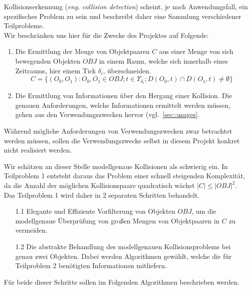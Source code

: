 Kollisionserkennung (\textit{eng. collision detection}) scheint, je nach Anwendungsfall, ein spezifisches Problem zu sein und beschreibt daher eine Sammlung verschiedener Teilprobleme.\\
Wir beschränken uns hier für die Zwecke des Projektes auf Folgende:
\begin{enumerate}
\item Die Ermittlung der Menge von Objektpaaren $C$ aus einer Menge von sich bewegenden Objekten $OBJ$ in einem Raum, welche sich innerhalb eines Zeitraums, hier einem Tick $\delta_i$, überschneiden.
$$C = \{(O_0, O_1) : O_0, O_1 \in OBJ; t\in \Upsilon_{\delta_i};  D(O_0, t) \cap D(O_1, t) \neq \emptyset\}$$
\item Die Ermittlung von Informationen über den Hergang einer Kollision.
Die genauen Anforderungen, welche Informationen ermittelt werden müssen, gehen aus den Verwendungszwecken hervor (vgl.~\ref{sec::usages}. 
\end{enumerate}

Während mögliche Anforderungen von Verwendungszwecken zwar betrachtet werden müssen, sollen die Verwendungszwecke selbst in diesem Projekt konkret nicht realisiert werden.

Wir schätzen an dieser Stelle modellgenaue Kollisionen als schwierig ein. In Teilproblem 1 entsteht daraus das Problem einer schnell steigenden Komplexität, da die Anzahl der möglichen Kollisionspaare quadratisch wächst $|C|\leq |OBJ|^2$.\\
Das Teilproblem 1 wird daher in 2 separaten Schritten behandelt.
\begin{itemize}
\item[1.1] Elegante und Effiziente Vorfilterung von Objekten $OBJ$, um die modellgenaue Überprüfung von großen Mengen von Objektpaaren in $C$ zu vermeiden.
\item[1.2] Die abstrakte Behandlung des modellgenauen Kollisionsproblems bei genau zwei Objekten. Dabei werden Algorithmen gewählt, welche die für Teilproblem 2 benötigten Informationen mitliefern.
\end{itemize}

Für beide dieser Schritte sollen im Folgenden Algorithmen beschrieben werden.\\
\\
